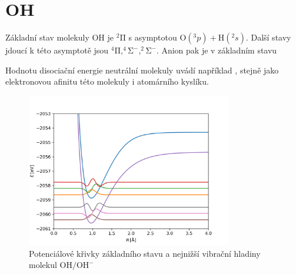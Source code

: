 \section{OH}
Základní stav molekuly OH je $\mathrm{^2\Pi}$ s asymptotou $\mathrm{O}(^3p) + \mathrm{H}(^2s)$. Další stavy jdoucí k této asymptotě jsou $\mathrm{^4\Pi, ^4\Sigma^-, ^2\Sigma^- }$. Anion pak je v základním stavu \TD

Hodnotu disociační energie neutrální molekuly uvádí například \cite{CRC_Handbook90}, stejně jako elektronovou afinitu této molekuly i atomárního kyslíku.
\begin{figure}
\centering
\includegraphics[width=0.8\textwidth]{../img/OH-vibr1.png}
\caption{Potenciálové křivky základního stavu a nejnižší vibrační hladiny molekul $\mathrm{OH/OH^-}$}
\label{VibrOH1}
\end{figure}
